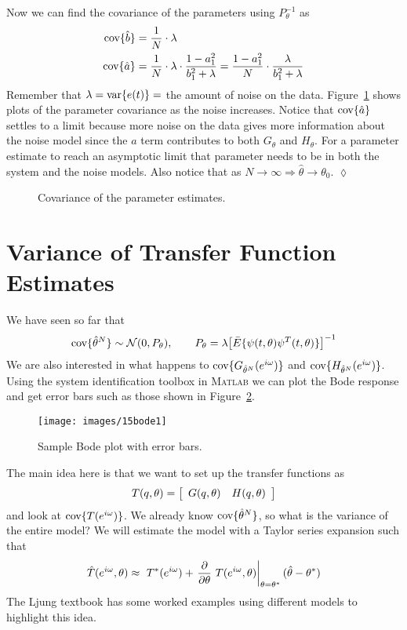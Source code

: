 \begin{example}
Now we can find the covariance of the parameters using $P_\theta^{-1}$ as
\begin{align*}
\text{cov}\{\hat{b}\} &= \frac{1}{N}\cdot\lambda \\
\text{cov}\{\hat{a}\} &= \frac{1}{N}\cdot\lambda\cdot\frac{1-a_1^2}{b_1^2+\lambda} = \frac{1-a_1^2}{N}\cdot\frac{\lambda}{b_1^2+\lambda}
\end{align*}
Remember that $\lambda = \text{var}\{e(t)\} = $ the amount of noise on the data.
Figure~\ref{fig:15cov} shows plots of the parameter covariance as the noise increases.
Notice that $\text{cov}\{\hat{a}\}$ settles to a limit because more noise on the data gives more information about the noise model since the $a$ term contributes to both $G_\theta$ and $H_\theta$.
For a parameter estimate to reach an asymptotic limit that parameter needs to be in both the system and the noise models.
Also notice that as $N\to\infty \Rightarrow \hat{\theta}\to\theta_0$.
$\lozenge$
\end{example}

\begin{figure}[ht!]
\centering
{} \hfill
{}
\caption{Covariance of the parameter estimates.}
\label{fig:15cov}
\end{figure}

\section{Variance of Transfer Function Estimates}
We have seen so far that
$$\text{cov}\{\hat{\theta}^N\}\sim\mathcal{N}(0,P_\theta), \qquad P_\theta = \lambda{\left[\bar{E}\{\psi(t,\theta)\psi^T(t,\theta)\}\right]}^{-1}$$
We are also interested in what happens to $\text{cov}\{G_{\hat{\theta}^N}(e^{i\omega})\}$ and $\text{cov}\{H_{\hat{\theta}^N}(e^{i\omega})\}$.
Using the system identification toolbox in \textsc{Matlab} we can plot the Bode response and get error bars such as those shown in Figure~\ref{fig:15bode1}.

\begin{figure}[ht!]
\centering
\texttt{[image: images/15bode1]}
\caption{Sample Bode plot with error bars.}
\label{fig:15bode1}
\end{figure}

The main idea here is that we want to set up the transfer functions as
$$T(q,\theta) = \left[\begin{array}{c c} G(q,\theta) & H(q,\theta) \end{array}\right]$$
and look at $\text{cov}\{T (e^{i\omega})\}$.
We already know $\text{cov}\{\hat{\theta}^N\}$, so what is the variance of the entire model? We will estimate the model with a Taylor series expansion such that
$$\hat{T} (e^{i\omega},\theta) \approx~T^\ast(e^{i\omega}) + \left.\frac{\partial}{\partial\theta}~T (e^{i\omega},\theta)\right|_{\theta=\theta^\ast} (\hat{\theta}-\theta^\ast)$$
The Ljung textbook has some worked examples using different models to highlight this idea.

